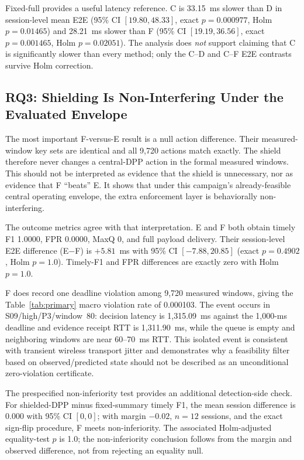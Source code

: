 \documentclass[10pt,journal]{IEEEtran}
\begin{document}
Fixed-full provides a useful latency reference. C is 33.15~ms slower than D in session-level mean E2E (95\% CI $[19.80,48.33]$, exact $p=0.000977$, Holm $p=0.01465$) and 28.21~ms slower than F (95\% CI $[19.19,36.56]$, exact $p=0.001465$, Holm $p=0.02051$). The analysis does \emph{not} support claiming that C is significantly slower than every method; only the C--D and C--F E2E contrasts survive Holm correction.

\subsection{RQ3: Shielding Is Non-Interfering Under the Evaluated Envelope}
The most important F-versus-E result is a null action difference. Their measured-window key sets are identical and all 9,720 actions match exactly. The shield therefore never changes a central-DPP action in the formal measured windows. This should not be interpreted as evidence that the shield is unnecessary, nor as evidence that F ``beats'' E. It shows that under this campaign's already-feasible central operating envelope, the extra enforcement layer is behaviorally non-interfering.

The outcome metrics agree with that interpretation. E and F both obtain timely F1 1.0000, FPR 0.0000, MaxQ 0, and full payload delivery. Their session-level E2E difference (E$-$F) is $+5.81$~ms with 95\% CI $[-7.88,20.85]$ (exact $p=0.4902$, Holm $p=1.0$). Timely-F1 and FPR differences are exactly zero with Holm $p=1.0$.

F does record one deadline violation among 9,720 measured windows, giving the Table~\ref{tab:primary} macro violation rate of 0.000103. The event occurs in S09/high/P3/window~80: decision latency is 1,315.09~ms against the 1,000-ms deadline and evidence receipt RTT is 1,311.90~ms, while the queue is empty and neighboring windows are near 60--70~ms RTT. This isolated event is consistent with transient wireless transport jitter and demonstrates why a feasibility filter based on observed/predicted state should not be described as an unconditional zero-violation certificate.

The prespecified non-inferiority test provides an additional detection-side check. For shielded-DPP minus fixed-summary timely F1, the mean session difference is 0.000 with 95\% CI $[0,0]$; with margin $-0.02$, $n=12$ sessions, and the exact sign-flip procedure, F meets non-inferiority. The associated Holm-adjusted equality-test $p$ is 1.0; the non-inferiority conclusion follows from the margin and observed difference, not from rejecting an equality null.
\end{document}
